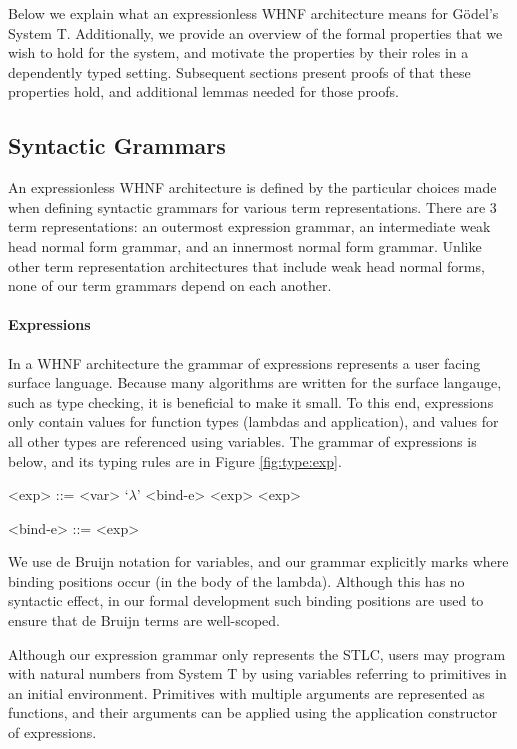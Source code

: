 \documentclass[preprint,authoryear]{sigplanconf}
\newcommand{\reffig}[1]{Figure \ref{fig:#1}}
\begin{document}
Below we explain what an expressionless WHNF
architecture means for G{\"o}del's System T.
Additionally, we provide an overview of the formal properties that we
wish to hold for the system, and motivate the properties by their roles in a
dependently typed setting. Subsequent sections present proofs of
that these properties hold, and additional lemmas needed for those
proofs.

\subsection{Syntactic Grammars}

An expressionless WHNF architecture is defined by the particular
choices made when defining syntactic grammars for various term
representations. There are 3 term representations: an outermost
expression grammar, an intermediate weak head normal form grammar, and
an innermost normal form grammar. Unlike other term
representation architectures that include weak head normal forms, none
of our term grammars depend on each another.

\paragraph{Expressions}

In a WHNF architecture the grammar of expressions represents a user
facing surface language. Because many algorithms are written for the
surface langauge, such as type checking, it is beneficial to make it
small. To this end, expressions only contain values for function types
(lambdas and application), and values for all other types are
referenced using variables. The grammar of expressions is below, and
its typing rules are in \reffig{type:exp}.

\begin{grammar}
<exp> ::= <var> 
\alt `\(\lambda\)' <bind-e>
\alt <exp> <exp>

<bind-e> ::= <exp> 
\end{grammar}

We use de Bruijn notation for variables, and our grammar
explicitly marks where binding positions occur (in the body of the
lambda). Although this has no syntactic effect, in our formal
development such binding positions are used to ensure that de Bruijn
terms are well-scoped.

Although our expression grammar only represents the STLC, users may
program with natural numbers from System T by using variables
referring to primitives in an initial environment. Primitives with
multiple arguments are represented as functions, and their arguments
can be applied using the application constructor of expressions.
\end{document}
